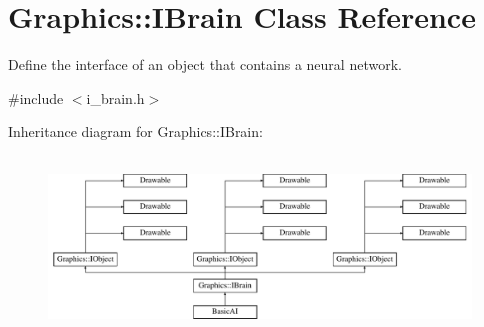 \section{Graphics\+:\+:I\+Brain Class Reference}
\label{class_graphics_1_1_i_brain}


Define the interface of an object that contains a neural network.  




{\ttfamily \#include $<$i\+\_\+brain.\+h$>$}

Inheritance diagram for Graphics\+:\+:I\+Brain\+:\begin{figure}[H]
\begin{center}
\leavevmode
\includegraphics[height=4.786325cm]{class_graphics_1_1_i_brain}
\end{center}
\end{figure}
